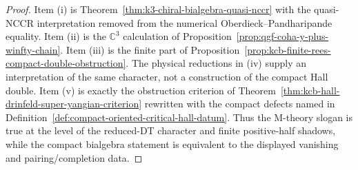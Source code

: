 \begin{proof}
Item \textup{(i)} is Theorem~\ref{thm:k3-chiral-bialgebra-quasi-nccr}
with the quasi-NCCR interpretation removed from the numerical
Oberdieck--Pandharipande equality. Item \textup{(ii)} is the
\(\mathbb C^3\) calculation of
Proposition~\ref{prop:qgf-coha-y-plus-winfty-chain}. Item \textup{(iii)}
is the finite part of
Proposition~\ref{prop:kcb-finite-rees-compact-double-obstruction}. The
physical reductions in \textup{(iv)} supply an interpretation of the
same character, not a construction of the compact Hall double. Item
\textup{(v)} is exactly the obstruction criterion of
Theorem~\ref{thm:kcb-hall-drinfeld-super-yangian-criterion} rewritten
with the compact defects named in
Definition~\ref{def:compact-oriented-critical-hall-datum}. Thus the
M-theory slogan is true at the level of the reduced-DT character and
finite positive-half shadows, while the compact bialgebra statement is
equivalent to the displayed vanishing and pairing/completion data.
\end{proof}

